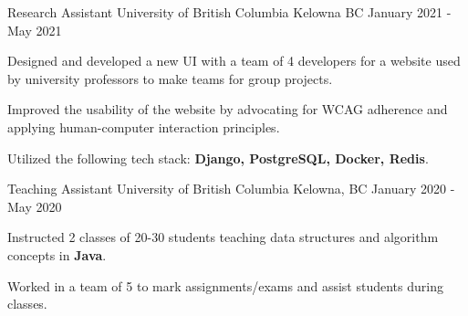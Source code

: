 \begin{cventries}


	\cventry
	{Research Assistant} %
	{University of British Columbia} %
	{Kelowna BC} %
	{January 2021 - May 2021} %
	{
		\begin{cvitems} %
			\item {Designed and developed a new UI with a team of 4 developers for a website used by university professors to make teams for group projects.}
			\item {Improved the usability of the website by advocating for WCAG adherence and applying human-computer interaction principles.}
			\item {Utilized the following tech stack:  \textbf{Django, PostgreSQL, Docker, Redis}.}
		\end{cvitems}
	}


	\cventry
	{Teaching Assistant} %
	{University of British Columbia} %
	{Kelowna, BC} %
	{January 2020 - May 2020} %
	{
		\begin{cvitems} %
			\item {Instructed 2 classes of 20-30 students teaching data structures and algorithm concepts in \textbf{Java}.}
			\item {Worked in a team of 5 to mark assignments/exams and assist students during classes.}
		\end{cvitems}
	}


\end{cventries}
